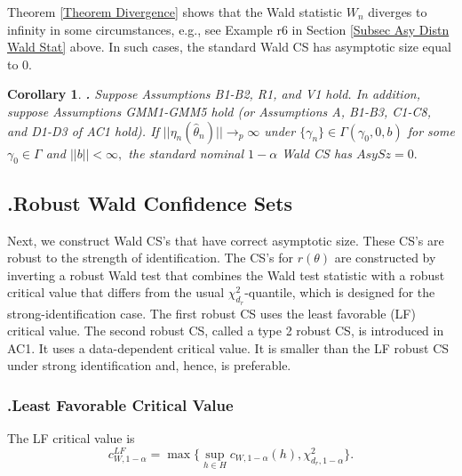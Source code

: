 \documentclass[12pt,thmsb,titlepage,final,oneside,letterpaper]{article}
\newtheorem{corollary}{Corollary}[section]
\begin{document}
Theorem \ref{Theorem Divergence} shows that the Wald statistic $W_{n}$
diverges to infinity in some circumstances, e.g., see Example r6 in Section %
\ref{Subsec Asy Distn Wald Stat} above. In such cases, the standard Wald CS
has asymptotic size equal to 0.

\begin{corollary}
\hspace{-0.08in}\textbf{.} \label{Corollary Wald 2}Suppose Assumptions \emph{%
B1-B2, R1,} and \emph{V1} hold. In addition, suppose Assumptions \emph{%
GMM1-GMM5 }hold \emph{(}or Assumptions \emph{A,} \emph{B1-B3,} \emph{C1-C8,}
and \emph{D1-D3} of \emph{AC1 }hold\emph{).} If $||\eta _{n}(\widehat{\theta 
}_{n})||\rightarrow _{p}\infty $ under $\{\gamma _{n}\}\in \Gamma (\gamma
_{0},0,b)$ for some $\gamma _{0}\in \Gamma $ and $||b||<\infty ,$ the
standard nominal $1-\alpha $ Wald CS has $AsySz=0.$
\end{corollary}

\subsection{\hspace{-0.23in}\textbf{.}\hspace{0.18in}Robust Wald Confidence
Sets\label{Robust Wald CS Subsec}}

\hspace{0.25in}Next, we construct Wald CS's that have correct asymptotic
size. These CS's are robust to the strength of identification. The CS's for $%
r(\theta )$ are constructed by inverting a robust Wald test that combines
the Wald test statistic with a robust critical value that differs from the
usual $\chi _{d_{r}}^{2}$-quantile, which is designed for the
strong-identification case. The first robust CS uses the least favorable
(LF) critical value. The second robust CS, called a type 2 robust CS, is
introduced in AC1. It uses a data-dependent critical value. It is smaller
than the LF robust CS under strong identification and, hence, is preferable.

\subsubsection{\hspace{-0.19in}\textbf{.}\hspace{0.18in}Least Favorable
Critical Value\textbf{\label{LF Subsubsec}}}

\hspace{0.25in}The LF critical value is%
\begin{equation}
c_{W,1-\alpha }^{LF}=\max \{\sup_{h\in H}c_{W,1-\alpha }(h),\chi
_{d_{r},1-\alpha }^{2}\}.  \label{LF defn}
\end{equation}
\end{document}
